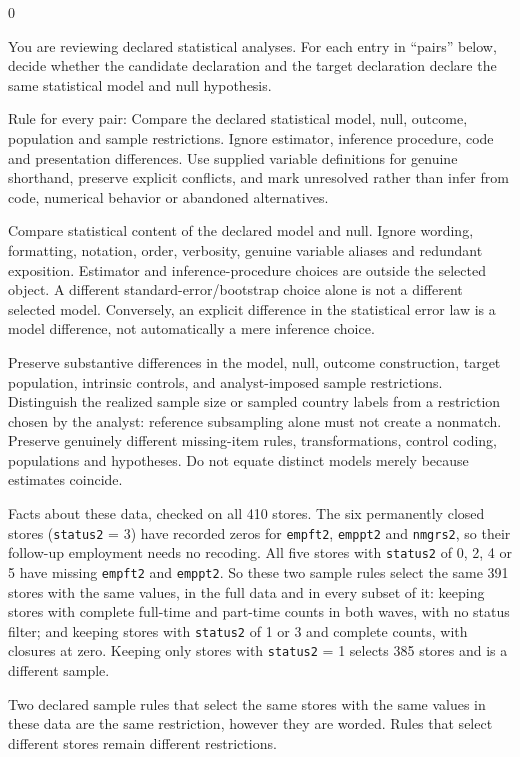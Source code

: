 \documentclass[10pt,border=0pt]{standalone}
\newlength{\promptwidth}
\newenvironment{promptbox}
  {\begin{lrbox}{0}\begin{minipage}{\dimexpr\promptwidth-2\fboxsep\relax}\small\setlength{\parskip}{0.5em}}
  {\end{minipage}\end{lrbox}\colorbox{promptbg}{\usebox{0}}}
\begin{document}
\begin{promptbox}
You are reviewing declared statistical analyses. For each entry in ``pairs'' below, decide whether the candidate declaration and the target declaration declare the same statistical model and null hypothesis.

Rule for every pair: Compare the declared statistical model, null, outcome, population and sample restrictions. Ignore estimator, inference procedure, code and presentation differences. Use supplied variable definitions for genuine shorthand, preserve explicit conflicts, and mark unresolved rather than infer from code, numerical behavior or abandoned alternatives.

Compare statistical content of the declared model and null. Ignore wording, formatting, notation, order, verbosity, genuine variable aliases and redundant exposition. Estimator and inference-procedure choices are outside the selected object. A different standard-error/bootstrap choice alone is not a different selected model. Conversely, an explicit difference in the statistical error law is a model difference, not automatically a mere inference choice.

Preserve substantive differences in the model, null, outcome construction, target population, intrinsic controls, and analyst-imposed sample restrictions. Distinguish the realized sample size or sampled country labels from a restriction chosen by the analyst: reference subsampling alone must not create a nonmatch. Preserve genuinely different missing-item rules, transformations, control coding, populations and hypotheses. Do not equate distinct models merely because estimates coincide.

Facts about these data, checked on all 410 stores. The six permanently closed stores (\texttt{status2} = 3) have recorded zeros for \texttt{empft2}, \texttt{emppt2} and \texttt{nmgrs2}, so their follow-up employment needs no recoding. All five stores with \texttt{status2} of 0, 2, 4 or 5 have missing \texttt{empft2} and \texttt{emppt2}. So these two sample rules select the same 391 stores with the same values, in the full data and in every subset of it: keeping stores with complete full-time and part-time counts in both waves, with no status filter; and keeping stores with \texttt{status2} of 1 or 3 and complete counts, with closures at zero. Keeping only stores with \texttt{status2} = 1 selects 385 stores and is a different sample.

Two declared sample rules that select the same stores with the same values in these data are the same restriction, however they are worded. Rules that select different stores remain different restrictions.


\end{promptbox}
\end{document}
